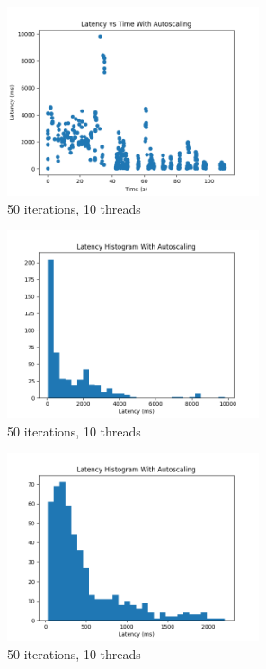 \documentclass{article}
\begin{document}
\begin{figure}[H]
    \centering
    \includegraphics[width=20em]{../plots/latency_with_autoscaling_50.png}
    \caption{50 iterations, 10 threads}
\end{figure}

\begin{figure}[H]
    \centering
    \includegraphics[width=20em]{../plots/latency_with_autoscaling_hist_50.png}
    \caption{50 iterations, 10 threads}
\end{figure}

\begin{figure}[H]
    \centering
    \includegraphics[width=20em]{../plots/latency_with_autoscaling_hist_50_warm.png}
    \caption{50 iterations, 10 threads}
\end{figure}
\end{document}
